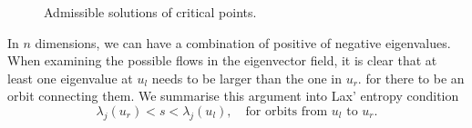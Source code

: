 \documentclass[10pt]{article}
\numberwithin{equation}{section}
\begin{document}
\begin{figure}[H]
    \begin{minipage}{.2\textwidth}
    \end{minipage}
    \caption{Admissible solutions of critical points.}
    \label{fig:LaxMotivation}
\end{figure}

In $n$ dimensions, we can have a combination of positive of negative eigenvalues.  When examining the possible flows in the eigenvector field, it is clear that at least one eigenvalue at $u_l$ needs to be larger than the one in $u_r$. for there to be an orbit connecting them. We summarise this argument into Lax' entropy condition
\begin{equation}
    \lambda_{j}(u_r) < s < \lambda_{j}(u_l), \quad \text{for orbits from $u_l$ to $u_r$}.
\end{equation}
\end{document}
